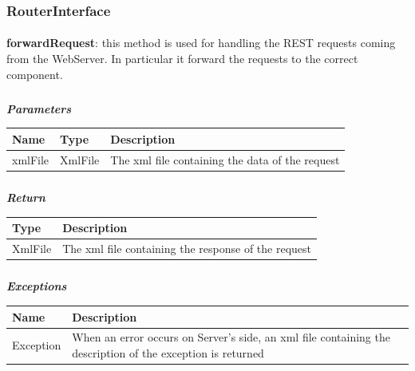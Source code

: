 				\subsubsection{RouterInterface}
					\paragraph{}
							\textbf{forwardRequest}: this method is used for handling the REST requests coming from the WebServer. In particular it forward the requests to the correct component.
							\subparagraph{}
							\vspace{-3mm}
							\textit{\textbf{Parameters}}
							\vspace{-2mm}
								\begin{table}[!h]
									\begin{tabular}{L{0.15\textwidth}L{0.15\textwidth}L{0.5\textwidth}}
										\toprule
										\textbf{Name} & \textbf{Type} & \textbf{Description} \\
										\midrule
								  		xmlFile & XmlFile & The xml file containing the data of the request  \\
								 		\bottomrule
									\end{tabular}
								\end{table}
							\subparagraph{}
							\vspace{-6mm}
								\textit{\textbf{Return}}
								\vspace{-2mm}
									\begin{table}[!h]
									\begin{tabular}{L{0.2\textwidth}L{0.6\textwidth}}
										\toprule
										\textbf{Type} & \textbf{Description} \\
										\midrule
								  		XmlFile & The xml file containing the response of the request \\
								 		\bottomrule
									\end{tabular}
								\end{table}
							\subparagraph{}
							\vspace{-6mm}
								\textit{\textbf{Exceptions}}
								\vspace{-2mm}
									\begin{table}[!h]
									\begin{tabular}{L{0.2\textwidth}L{0.6\textwidth}}
										\toprule
										\textbf{Name} & \textbf{Description} \\
										\midrule
								  		Exception & When an error occurs on Server's side, an xml file containing the description of the exception is returned \\
								 		\bottomrule
									\end{tabular}
								\end{table}
						
